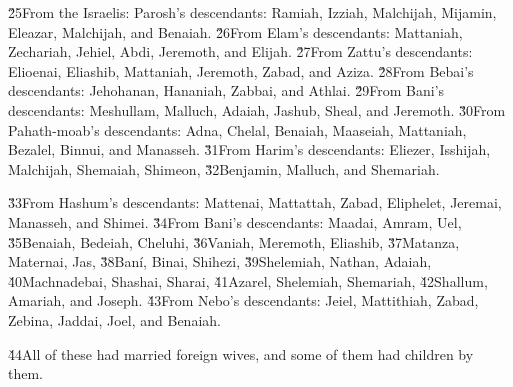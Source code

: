 \v{25}From the Israelis: Parosh's descendants: Ramiah, Izziah, Malchijah, Mijamin, Eleazar, Malchijah, and Benaiah. \v{26}From Elam's descendants: Mattaniah, Zechariah, Jehiel, Abdi, Jeremoth, and Elijah. \v{27}From Zattu's descendants: Elioenai, Eliashib, Mattaniah, Jeremoth, Zabad, and Aziza. \v{28}From Bebai's descendants: Jehohanan, Hananiah, Zabbai, and Athlai. \v{29}From Bani's descendants: Meshullam, Malluch, Adaiah, Jashub, Sheal, and Jeremoth. \v{30}From Pahath-moab's descendants: Adna, Chelal, Benaiah, Maaseiah, Mattaniah, Bezalel, Binnui, and Manasseh. \v{31}From Harim's descendants: Eliezer, Isshijah, Malchijah, Shemaiah, Shimeon, \v{32}Benjamin, Malluch, and Shemariah.

\v{33}From Hashum's descendants: Mattenai, Mattattah, Zabad, Eliphelet, Jeremai, Manasseh, and Shimei. \v{34}From Bani's descendants: Maadai, Amram, Uel, \v{35}Benaiah, Bedeiah, Cheluhi, \v{36}Vaniah, Meremoth, Eliashib, \v{37}Matanza, Maternai, Jas, \v{38}Ban\'{i}, Binai, Shihezi, \v{39}Shelemiah, Nathan, Adaiah, \v{40}Machnadebai, Shashai, Sharai, \v{41}Azarel, Shelemiah, Shemariah, \v{42}Shallum, Amariah, and Joseph. \v{43}From Nebo's descendants: Jeiel, Mattithiah, Zabad, Zebina, Jaddai, Joel, and Benaiah.

\v{44}All of these had married foreign wives, and some of them had children by them.
